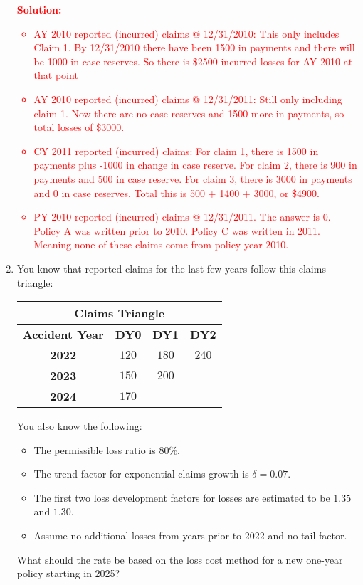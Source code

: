 \documentclass{article}
\begin{document}
\begin{enumerate}
\textcolor{red}{\textbf{Solution:}
\begin{itemize}
\item AY 2010 reported (incurred) claims @ 12/31/2010: This only includes Claim 1. By 12/31/2010 there have been 1500 in payments and there will be 1000 in case reserves. So there is \$2500 incurred losses for AY 2010 at that point
\item AY 2010 reported (incurred) claims @ 12/31/2011: Still only including claim 1. Now there are no case reserves and 1500 more in payments, so total losses of \$3000. 
    \item CY 2011 reported (incurred) claims: For claim 1, there is 1500 in payments plus -1000 in change in case reserve. For claim 2, there is 900 in payments and 500 in case reserve. For claim 3, there is 3000 in payments and 0 in case reserves. Total this is 500 + 1400 + 3000, or \$4900. 
    \item PY 2010 reported (incurred) claims @ 12/31/2011. The answer is  0. Policy A was written prior to 2010. Policy C was written in 2011. Meaning none of these claims come from policy year 2010. 
\end{itemize}
}

\item 
You know that reported claims for the last few years follow this claims triangle:
\begin{table}[htbp]
    \centering
    \begin{tabular}{|c|c|c|c|}
    \hline
    \multicolumn{4}{|c|}{\textbf{Claims Triangle}} \\ \hline
    \textbf{Accident Year} & \textbf{DY0} & \textbf{DY1} & \textbf{DY2} \\ \hline
    \textbf{2022} & $120$ & $180$ & $240$ \\ \hline
    \textbf{2023} & $150$ & $200$ &  \\ \hline
    \textbf{2024} & $170$ & &  \\ \hline
    \end{tabular}
\end{table}
You also know the following:
\begin{itemize}
\item The permissible loss ratio is $80\%$.
\item The trend factor for exponential claims growth is $\delta = 0.07$.
\item The first two loss development factors for losses are estimated to be $1.35$ and $1.30$.
\item Assume no additional losses from years prior to 2022 and no tail factor.
\end{itemize}
What should the rate be based on the loss cost method for a new one-year policy starting in 2025?


\end{enumerate}
\end{document}
